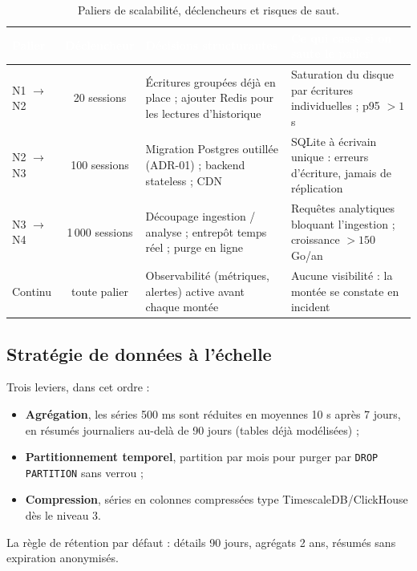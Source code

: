 \documentclass[11pt,a4paper]{article}
\begin{document}
\begin{table}[H]
\centering\small
\begin{tabularx}{\linewidth}{p{2.5cm} c p{4.7cm} X}
\toprule
\rowcolor{cwblue} \textcolor{white}{\bf Palier} & \textcolor{white}{\bf Déclencheur} &
\textcolor{white}{\bf Décisions structurantes} & \textcolor{white}{\bf Ce qui casse si on saute le
palier} \\
\midrule
N1 $\to$ N2 & 20 sessions & Écritures groupées déjà en place ; ajouter Redis pour les lectures
 d'historique & Saturation du disque par écritures individuelles ; p95 $> 1$ s \\
N2 $\to$ N3 & 100 sessions & Migration Postgres outillée (ADR-01) ; backend stateless ; CDN & SQLite
 à écrivain unique : erreurs d'écriture, jamais de réplication \\
N3 $\to$ N4 & 1\,000 sessions & Découpage ingestion / analyse ; entrepôt temps réel ; purge en ligne &
 Requêtes analytiques bloquant l'ingestion ; croissance $> 150$ Go/an \\
Continu & toute palier & Observabilité (métriques, alertes) active avant chaque montée & Aucune
 visibilité : la montée se constate en incident \\
\bottomrule
\end{tabularx}
\caption{Paliers de scalabilité, déclencheurs et risques de saut.}
\label{tab:paliers}
\end{table}

\subsection{Stratégie de données à l'échelle}
Trois leviers, dans cet ordre :
\begin{itemize}[leftmargin=1.5em,itemsep=1pt,topsep=2pt,parsep=0pt]
 \item \textbf{Agrégation}, les séries 500 ms sont réduites en moyennes 10 s après 7 jours, en
 résumés journaliers au-delà de 90 jours (tables déjà modélisées) ;
 \item \textbf{Partitionnement temporel}, partition par mois pour purger par \texttt{DROP
 PARTITION} sans verrou ;
 \item \textbf{Compression}, séries en colonnes compressées type TimescaleDB/ClickHouse dès le
 niveau 3.
\end{itemize}
La règle de rétention par défaut : détails 90 jours, agrégats 2 ans, résumés sans
expiration anonymisés.
\end{document}
